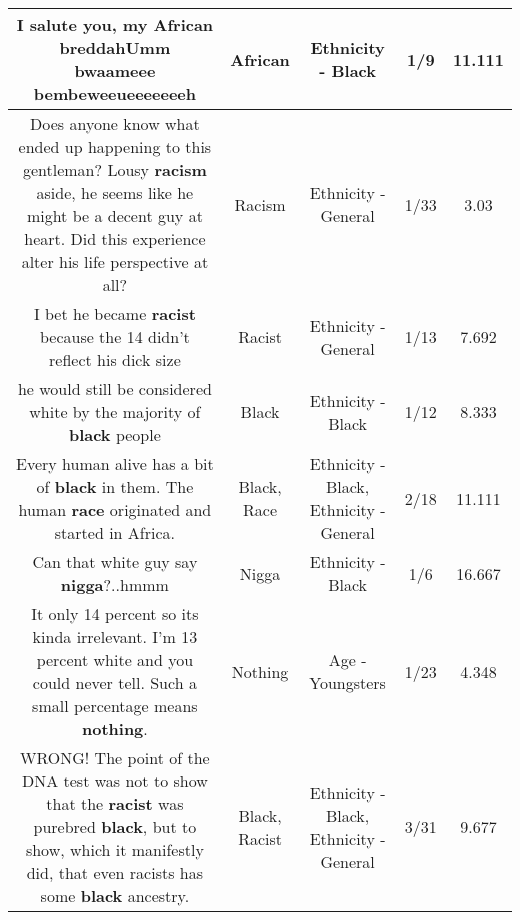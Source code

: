 \documentclass[11pt]{article}
\newlength\mylength
\begin{document}
\begin{center}
\begin{longtable}{|C{.65\mylength}|C{.30\mylength}|C{.12\mylength}|C{.12\mylength}|C{.12\mylength}|}
  \small I salute you, my \textbf{African} breddahUmm bwaameee bembeweeueeeeeeeh\normalsize   & African & Ethnicity - Black & 1/9 & 11.111 \\  \hline
  \small Does anyone know what ended up happening to this gentleman? Lousy \textbf{racism} aside, he seems like he might be a decent guy at heart. Did this experience alter his life perspective at all?\normalsize   & Racism & Ethnicity - General & 1/33 & 3.03 \\  \hline
  \small I bet he became \textbf{racist} because the 14 didn't reflect his dick size\normalsize   & Racist & Ethnicity - General & 1/13 & 7.692 \\  \hline
  \small he would still be considered white by the majority of \textbf{black} people\normalsize   & Black & Ethnicity - Black & 1/12 & 8.333 \\  \hline
  \small Every human alive has a bit of \textbf{black} in them. The human \textbf{race} originated and started in Africa.\normalsize   & Black, Race & Ethnicity - Black, Ethnicity - General & 2/18 & 11.111 \\  \hline
  \small Can that white guy say \textbf{nigga}?..hmmm\normalsize   & Nigga & Ethnicity - Black & 1/6 & 16.667 \\  \hline
  \small It only 14 percent so its kinda irrelevant. I'm 13 percent white and you could never tell. Such a small percentage means \textbf{nothing}.\normalsize   & Nothing & Age - Youngsters & 1/23 & 4.348 \\  \hline
  \small WRONG!  The point of the DNA test was not to show that the \textbf{racist} was purebred \textbf{black},  but to show, which it manifestly did, that even racists has some \textbf{black} ancestry.\normalsize   & Black, Racist & Ethnicity - Black, Ethnicity - General & 3/31 & 9.677 \\  \hline

\end{longtable}
\end{center}
\end{document}
